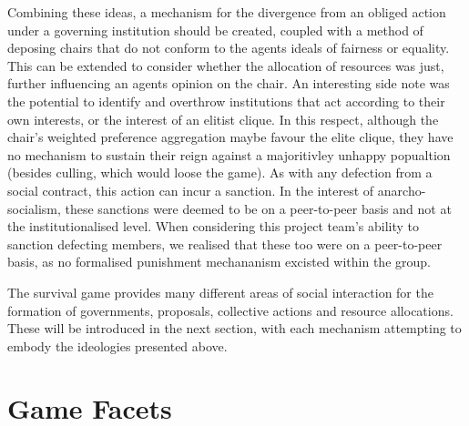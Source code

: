 
Combining these ideas, a mechanism for the divergence from an obliged action under a governing institution should be created, coupled with a method of deposing chairs that do not conform to the agents ideals of fairness or equality. This can be extended to consider whether the allocation of resources was just, further influencing an agents opinion on the chair. An interesting side note was the potential to identify and overthrow institutions that act according to their own interests, or the interest of an elitist clique. In this respect, although the chair's weighted preference aggregation maybe favour the elite clique, they have no mechanism to sustain their reign against a majoritivley unhappy popualtion (besides culling, which would loose the game). As with any defection from a social contract, this action can incur a sanction. In the interest of anarcho-socialism, these sanctions were deemed to be on a peer-to-peer basis and not at the institutionalised level. When considering this project team's ability to sanction defecting members, we realised that these too were on a peer-to-peer basis, as no formalised punishment mechananism excisted within the group.  

The survival game provides many different areas of social interaction for the formation of governments, proposals, collective actions and resource allocations. These will be introduced in the next section, with each mechanism attempting to embody the ideologies presented above. 

\clearpage

\section{Game Facets}\label{sec: game facets}

